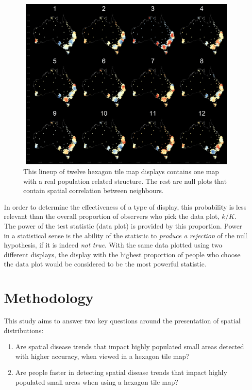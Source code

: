 \documentclass[
]{article}
\providecommand{\tightlist}{%
  \setlength{\itemsep}{0pt}\setlength{\parskip}{0pt}}
\begin{document}
\begin{figure}
\includegraphics[width=1\linewidth]{paper_files/figure-latex/lineup-1} \caption{This lineup of twelve hexagon tile map displays contains one map with a real population related structure. The rest are null plots that contain spatial correlation between neighbours.}\label{fig:lineup}
\end{figure}

In order to determine the effectiveness of a type of display, this
probability is less relevant than the overall proportion of observers
who pick the data plot, \(k/K\). The power of the test statistic (data
plot) is provided by this proportion. Power in a statistical sense is
the ability of the statistic to \emph{produce a rejection} of the null
hypothesis, if it is indeed \emph{not true}. With the same data plotted
using two different displays, the display with the highest proportion of
people who choose the data plot would be considered to be the most
powerful statistic.

\section{Methodology}\label{methodology}

This study aims to answer two key questions around the presentation of
spatial distributions:

\begin{enumerate}
\def\labelenumi{\arabic{enumi}.}
\tightlist
\item
  Are spatial disease trends that impact highly populated small areas
  detected with higher accuracy, when viewed in a hexagon tile map?
\item
  Are people faster in detecting spatial disease trends that impact
  highly populated small areas when using a hexagon tile map?
\end{enumerate}
\end{document}
